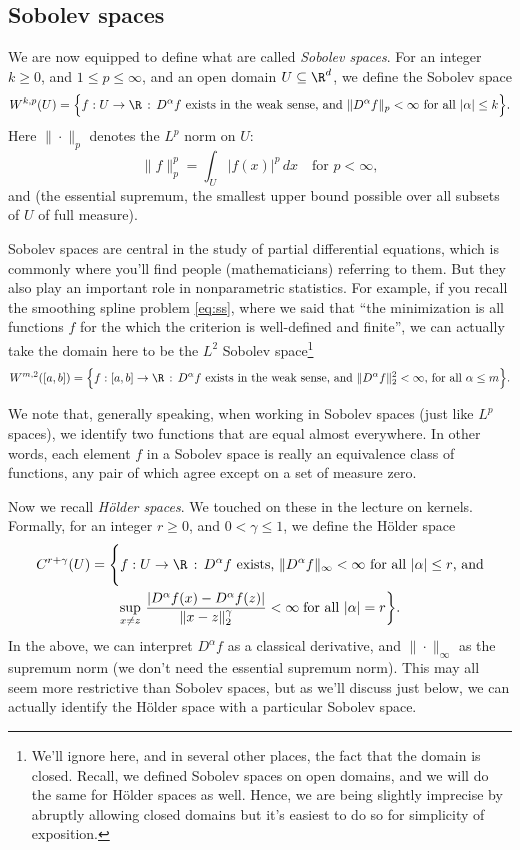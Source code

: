 \documentclass{article}
\DeclareMathOperator*{\esssup}{ess\,sup}
\begin{document}
\subsection{Sobolev spaces}

We are now equipped to define what are called \emph{Sobolev spaces}. For an
integer $k \geq  0$, and $1 \leq p \leq \infty$, and an open domain $U \subseteq 
\R^d$, we define the Sobolev space        
\[
W^{k,p}(U) = \Big\{ f : U \to \R \,:\, \text{$D^\alpha f$ exists in the weak
  sense, and $\|D^\alpha f\|_p < \infty$ for all $|\alpha| \leq k$} \Big\}. 
\]
Here $\|\cdot\|_p$ denotes the $L^p$ norm on $U$: 
\[
\|f\|_p^p = \int_U |f(x)|^p \, dx \quad \text{for $p < \infty$}, 
\]
and \smash{$\|f\|_\infty = \esssup_{x \in U} \, |f(x)|$} (the essential
supremum, the smallest upper bound possible over all subsets of $U$ of full
measure).

Sobolev spaces are central in the study of partial differential equations, which
is commonly where you'll find people (mathematicians) referring to them. But
they also play an important role in nonparametric statistics. For example, if
you recall the smoothing spline problem \eqref{eq:ss}, where we said that ``the
minimization is all functions $f$ for the which the criterion is well-defined
and finite'', we can actually take the domain here to be the $L^2$ Sobolev 
space\footnote{We'll ignore here, and in several other places, the fact that 
  the domain is closed. Recall, we defined Sobolev spaces on open domains, 
  and we will do the same for H{\"o}lder spaces as well. Hence, we are being 
  slightly imprecise by abruptly allowing closed domains but it's easiest to do 
  so for simplicity of exposition.}    
\[
W^{m,2}([a,b]) = \Big\{ f : [a,b] \to \R \,:\, \text{$D^\alpha f$ exists in the
  weak sense, and $\|D^\alpha f\|_2^2 < \infty$, for all $\alpha \leq m$}
\Big\}.     
\]

We note that, generally speaking, when working in Sobolev spaces (just like
$L^p$ spaces), we identify two functions that are equal almost everywhere. In 
other words, each element $f$ in a Sobolev space is really an equivalence class
of functions, any pair of which agree except on a set of measure zero.

Now we recall \emph{H{\"o}lder spaces}. We touched on these in the lecture on 
kernels. Formally, for an integer $r \geq 0$, and $0 < \gamma \leq 1$, we define
the H{\"o}lder space
\begin{multline*}
C^{r+\gamma}(U) = \Bigg\{ f : U \to \R \,:\, \text{$D^\alpha f$ exists,
  $\|D^\alpha f\|_\infty < \infty$ for all $|\alpha| \leq r$, and} \\   
  \sup_{x \not= z} \, \frac{|D^\alpha f(x) - D^\alpha f(z)|}{\|x-z\|_2^\gamma} < 
  \infty \; \text{for all $|\alpha| = r$} \bigg\}.   
\end{multline*}
In the above, we can interpret $D^\alpha f$ as a classical derivative, and
$\|\cdot\|_\infty$ as the supremum norm (we don't need the essential supremum
norm). This may all seem more restrictive than Sobolev spaces, but as we'll
discuss just below, we can actually identify the H{\"o}lder space with a
particular Sobolev space.       
\end{document}
